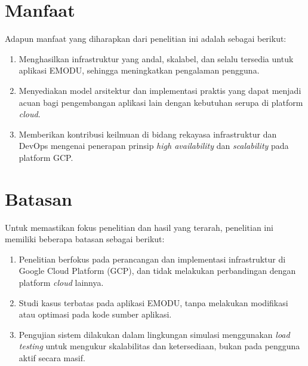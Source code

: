 \section{Manfaat}

{Adapun manfaat yang diharapkan dari penelitian ini adalah sebagai
berikut:}

\begin{enumerate}
  \item
    {Menghasilkan infrastruktur yang andal, skalabel, dan selalu tersedia untuk aplikasi EMODU, sehingga meningkatkan pengalaman pengguna.}
  \item
    {Menyediakan model arsitektur dan implementasi praktis yang dapat menjadi acuan bagi pengembangan aplikasi lain dengan kebutuhan serupa di platform \textit{cloud}.}
  \item
    {Memberikan kontribusi keilmuan di bidang rekayasa infrastruktur dan DevOps mengenai penerapan prinsip \textit{high availability} dan \textit{scalability} pada platform GCP.}
\end{enumerate}

\section{Batasan}

{Untuk memastikan fokus penelitian dan hasil yang terarah, penelitian
ini memiliki beberapa batasan sebagai berikut:}

\begin{enumerate}
  \item
    {Penelitian berfokus pada perancangan dan implementasi infrastruktur di Google Cloud Platform (GCP), dan tidak melakukan perbandingan dengan platform \textit{cloud} lainnya.}
  \item
    {Studi kasus terbatas pada aplikasi EMODU, tanpa melakukan modifikasi atau optimasi pada kode sumber aplikasi.}
  \item
    {Pengujian sistem dilakukan dalam lingkungan simulasi menggunakan \textit{load testing} untuk mengukur skalabilitas dan ketersediaan, bukan pada pengguna aktif secara masif.}
\end{enumerate}
